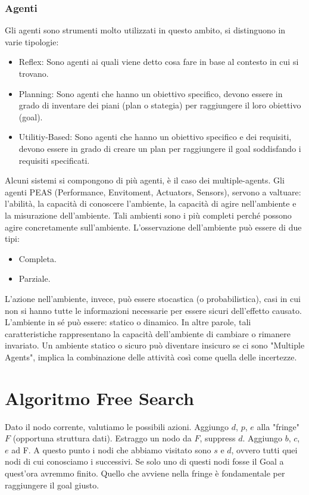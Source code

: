 \newpage
{}
\subsubsection{Agenti}
Gli agenti sono strumenti molto utilizzati in questo ambito, si distinguono in varie tipologie:
\begin{itemize}
    \item Reflex: Sono agenti ai quali viene detto cosa fare in base al contesto in cui si trovano.
    \item Planning: Sono agenti che hanno un obiettivo specifico, devono essere in grado di inventare dei piani (plan o stategia) per raggiungere il loro obiettivo (goal).
    \item Utilitiy-Based: Sono agenti che hanno un obiettivo specifico e dei requisiti, devono essere in grado di creare un plan per raggiungere il goal soddisfando i requisiti specificati.
\end{itemize}
Alcuni sistemi si compongono di più agenti, è il caso dei multiple-agents.
Gli agenti PEAS (Performance, Envitoment, Actuators, Sensors), servono a valtuare: l'abilità, la capacità di conoscere l'ambiente, la capacità di agire nell'ambiente e la misurazione dell'ambiente.
Tali ambienti sono i più completi perché possono agire concretamente sull'ambiente.
L'osservazione dell'ambiente può essere di due tipi:
\begin{itemize}
    \item Completa. 
    \item Parziale.
\end{itemize}  
L'azione nell'ambiente, invece, può essere stocastica (o probabilistica), casi in cui non si hanno tutte le informazioni necessarie per essere sicuri dell'effetto causato.
L'ambiente in sé può essere: statico o dinamico. In altre parole, tali caratteristiche rappresentano la capacità dell'ambiente di cambiare o rimanere invariato.
Un ambiente statico o sicuro può diventare insicuro se ci sono "Multiple Agents", implica la combinazione delle attività così come quella delle incertezze.


\newpage
\newpage
\section{Algoritmo Free Search}
Dato il nodo corrente, valutiamo le possibili azioni.
Aggiungo $d$, $p$, $e$ alla "fringe" $F$ (opportuna struttura dati).
Estraggo un nodo da $F$, suppress $d$.
Aggiungo $b$, $c$, $e$ ad F.
A questo punto i nodi che abbiamo visitato sono $s$ e $d$, ovvero tutti quei nodi di cui conosciamo i successivi.
Se solo uno di questi nodi fosse il Goal a quest'ora avremmo finito. 
\newline
Quello che avviene nella fringe è fondamentale per raggiungere il goal giusto.
\newline
{}